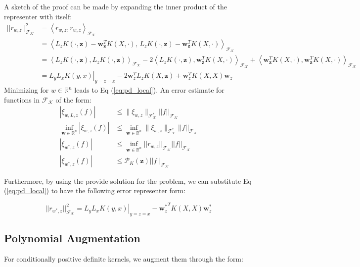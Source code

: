\documentclass[11pt]{article}
\begin{document}
\noindent A sketch of the proof can be made by expanding the inner product of the representer with itself:
\begin{align*}
	||r_{w,z}||_\mathcal{F_K}^2 &= \left\langle r_{w,z}, r_{w,z} \right\rangle_{\mathcal{F_K}}\\
	&= \left\langle L_z K(\cdot, \bm{z}) - \bm{w}^T_{\bm{z}} K(X,\cdot), \, L_z K(\cdot, \bm{z}) - \bm{w}^T_{\bm{z}} K(X,\cdot) \right\rangle_{\mathcal{F_K}}\\
	&= \left\langle L_z K(\cdot, \bm{z}), L_z K(\cdot, \bm{z}) \right\rangle_{\mathcal{F_K}} - 2 \left\langle L_z K(\cdot, \bm{z}) , \bm{w}^T_{\bm{z}} K(X,\cdot) \right\rangle_{\mathcal{F_K}} \allowbreak{} + \left\langle \bm{w}^T_{\bm{z}} K(X,\cdot), \bm{w}^T_{\bm{z}} K(X,\cdot) \right\rangle_{\mathcal{F_K}}\\
	&= \left. L_y L_x K(y,x) \right|_{y=z=x} - 2 \bm{w}_z^T L_z K(X,\bm{z}) + \bm{w}_z^T K(X,X)\bm{w}_z
\end{align*}
Minimizing for $w \in \mathbb{R}^n$ leads to Eq (\ref{eq:pd_local}). An error estimate for functions in $\mathcal{F_K}$ of the form:
\begin{align*}
	|\xi_{w,L,z}(f)| &\le \| \xi_{w,z} \|_\mathcal{F_K^*} ||f||_\mathcal{F_K} \\
	\inf_{\bm{w}\in \mathbb{R}^n} |\xi_{w,z}(f)| &\le \inf_{\bm{w}\in \mathbb{R}^n} \| \xi_{w,z} \|_\mathcal{F_K^*} ||f||_\mathcal{F_K}\\	
	|\xi_{w^*,z}(f)| &\le \inf_{\bm{w}\in \mathbb{R}^n} ||r_{w,z}||_\mathcal{F_K} ||f||_\mathcal{F_K}\\
	|\xi_{w^*,z}(f)| &\le \mathcal{P}_{K}(\bm{z}) ||f||_\mathcal{F_K}
\end{align*}

Furthermore, by using the provide solution for the problem, we can substitute Eq (\ref{eq:pd_local}) to have the following error representer form:

\begin{equation}
	||r_{w^*,z}||_\mathcal{F_K}^2 = \left. L_y L_x K(y,x) \right|_{y=z=x} - {\bm{w}_z^*}^T K(X,X)\bm{w}^*_z
\end{equation}

\subsection{Polynomial Augmentation}

For conditionally positive definite kernels, we augment them through the form:
\end{document}
